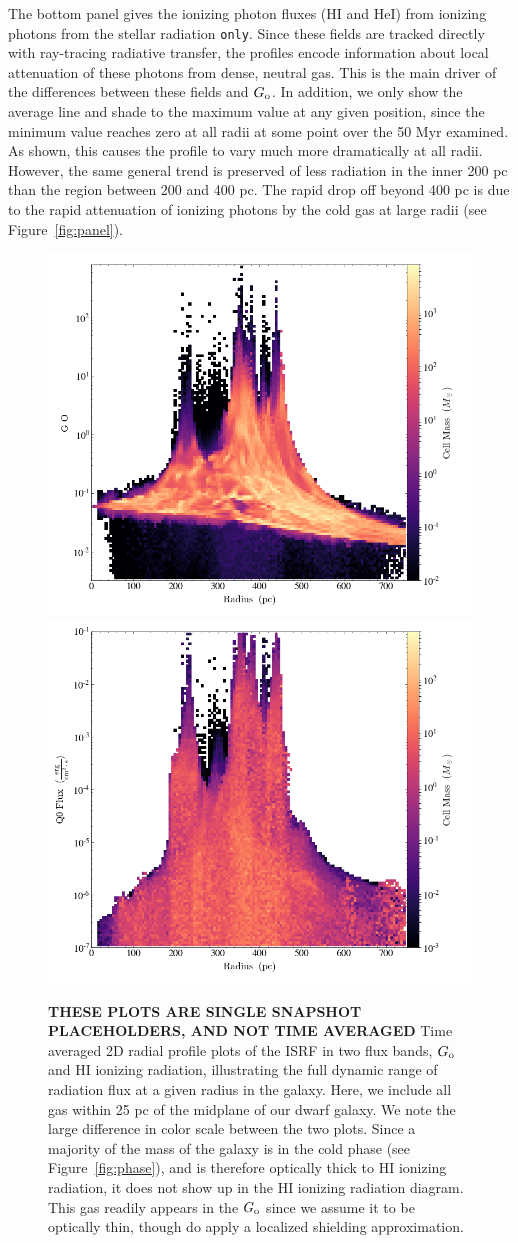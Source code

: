 \documentclass[twocolumn]{aastex61}
\begin{document}
The bottom panel gives the ionizing photon fluxes (HI and HeI) from ionizing photons from the stellar radiation \texttt{only}. Since these fields are tracked directly with ray-tracing radiative transfer, the profiles encode information about local attenuation of these photons from dense, neutral gas. This is the main driver of the differences between these fields and $G_{\rm o}$. In addition, we only show the average line and shade to the maximum value at any given position, since the minimum value reaches zero at all radii at some point over the 50 Myr examined. As shown, this causes the profile to vary much more dramatically at all radii. However, the same general trend is preserved of less radiation in the inner 200 pc than the region between 200 and 400 pc. The rapid drop off beyond 400 pc is due to the rapid attenuation of ionizing photons by the cold gas at large radii (see Figure~\ref{fig:panel}).

\begin{figure}
\centering
\includegraphics[width=0.45\linewidth]{g_o_2D_phase}
\includegraphics[width=0.45\linewidth]{q_o_2D_phase}
\caption{\textbf{THESE PLOTS ARE SINGLE SNAPSHOT PLACEHOLDERS, AND NOT TIME AVERAGED} Time averaged 2D radial profile plots of the ISRF in two flux bands, $G_{\rm o}$ and HI ionizing radiation, illustrating the full dynamic range of radiation flux at a given radius in the galaxy. Here, we include all gas within 25 pc of the midplane of our dwarf galaxy. We note the large difference in color scale between the two plots. Since a majority of the mass of the galaxy is in the cold phase (see Figure~\ref{fig:phase}), and is therefore optically thick to HI ionizing radiation, it does not show up in the HI ionizing radiation diagram. This gas readily appears in the $G_{\rm o}$ since we assume it to be optically thin, though do apply a localized shielding approximation.}
\label{fig:ISRF}
\end{figure}
\end{document}
